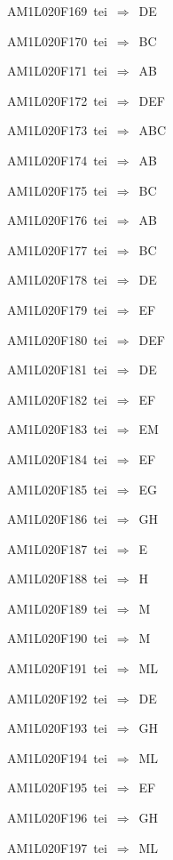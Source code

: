 {\sixrm AM1L020F169\ {\sixit tei}\ }$\Rightarrow$\ DE\par\smallskip
{\sixrm AM1L020F170\ {\sixit tei}\ }$\Rightarrow$\ BC\par\smallskip
{\sixrm AM1L020F171\ {\sixit tei}\ }$\Rightarrow$\ AB\par\smallskip
{\sixrm AM1L020F172\ {\sixit tei}\ }$\Rightarrow$\ DEF\par\smallskip
{\sixrm AM1L020F173\ {\sixit tei}\ }$\Rightarrow$\ ABC\par\smallskip
{\sixrm AM1L020F174\ {\sixit tei}\ }$\Rightarrow$\ AB\par\smallskip
{\sixrm AM1L020F175\ {\sixit tei}\ }$\Rightarrow$\ BC\par\smallskip
{\sixrm AM1L020F176\ {\sixit tei}\ }$\Rightarrow$\ AB\par\smallskip
{\sixrm AM1L020F177\ {\sixit tei}\ }$\Rightarrow$\ BC\par\smallskip
{\sixrm AM1L020F178\ {\sixit tei}\ }$\Rightarrow$\ DE\par\smallskip
{\sixrm AM1L020F179\ {\sixit tei}\ }$\Rightarrow$\ EF\par\smallskip
{\sixrm AM1L020F180\ {\sixit tei}\ }$\Rightarrow$\ DEF\par\smallskip
{\sixrm AM1L020F181\ {\sixit tei}\ }$\Rightarrow$\ DE\par\smallskip
{\sixrm AM1L020F182\ {\sixit tei}\ }$\Rightarrow$\ EF\par\smallskip
{\sixrm AM1L020F183\ {\sixit tei}\ }$\Rightarrow$\ EM\par\smallskip
{\sixrm AM1L020F184\ {\sixit tei}\ }$\Rightarrow$\ EF\par\smallskip
{\sixrm AM1L020F185\ {\sixit tei}\ }$\Rightarrow$\ EG\par\smallskip
{\sixrm AM1L020F186\ {\sixit tei}\ }$\Rightarrow$\ GH\par\smallskip
{\sixrm AM1L020F187\ {\sixit tei}\ }$\Rightarrow$\ E\par\smallskip
{\sixrm AM1L020F188\ {\sixit tei}\ }$\Rightarrow$\ H\par\smallskip
{\sixrm AM1L020F189\ {\sixit tei}\ }$\Rightarrow$\ M\par\smallskip
{\sixrm AM1L020F190\ {\sixit tei}\ }$\Rightarrow$\ M\par\smallskip
{\sixrm AM1L020F191\ {\sixit tei}\ }$\Rightarrow$\ ML\par\smallskip
{\sixrm AM1L020F192\ {\sixit tei}\ }$\Rightarrow$\ DE\par\smallskip
{\sixrm AM1L020F193\ {\sixit tei}\ }$\Rightarrow$\ GH\par\smallskip
{\sixrm AM1L020F194\ {\sixit tei}\ }$\Rightarrow$\ ML\par\smallskip
{\sixrm AM1L020F195\ {\sixit tei}\ }$\Rightarrow$\ EF\par\smallskip
{\sixrm AM1L020F196\ {\sixit tei}\ }$\Rightarrow$\ GH\par\smallskip
{\sixrm AM1L020F197\ {\sixit tei}\ }$\Rightarrow$\ ML\par\smallskip

